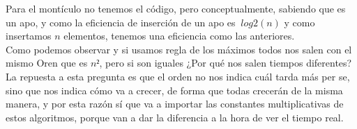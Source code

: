 Para el montículo no tenemos el código, pero conceptualmente, sabiendo que es un apo, y como la eficiencia de inserción de un apo es $\ log{2} (n)$ y como insertamos $n$ elementos, tenemos una eficiencia como las anteriores.\\

Como podemos observar y si usamos regla de los máximos todos nos salen con el mismo Oren que es $n²$, pero si son iguales ¿Por qué nos salen tiempos diferentes?\\

La repuesta a esta pregunta es que el orden no nos indica cuál tarda más per se, sino que nos indica cómo va a crecer, de forma que todas crecerán de la misma manera, y por esta razón sí que va a importar las constantes multiplicativas de estos algoritmos, porque van a dar la diferencia a la hora de ver el tiempo real.\\